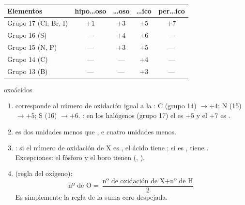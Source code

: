 \documentclass[12pt]{article}
\theoremstyle{mygreennumbox}
\begin{document}
\begin{center}
    \begin{tabular}{@{}lcccc@{}}
        \toprule
        \textbf{Elementos} & \textbf{hipo\dots oso} & \textbf{\dots oso} & \textbf{\dots ico} & \textbf{per\dots ico} \\
        \midrule
        Grupo 17 (Cl, Br, I) & \(+1\) & \(+3\) & \(+5\) & \(+7\) \\[3pt]
        Grupo 16 (S) & --- & \(+4\) & \(+6\) & --- \\[3pt]
        Grupo 15 (N, P) & --- & \(+3\) & \(+5\) & --- \\[3pt]
        Grupo 14 (C) & --- & --- & \(+4\) & --- \\[3pt]
        Grupo 13 (B) & --- & --- & \(+3\) & --- \\
        \bottomrule
    \end{tabular}
\end{center}

\begin{consejos}{oxoácidos}
    \begin{enumerate}[label=\numberballgreen]
        \item {} corresponde al número de oxidación igual a la : C (grupo 14) \(\to +4\); N (15) \(\to +5\); S (16) \(\to +6\). : en los halógenos (grupo 17) el  es \(+5\) y el \(+7\) es .
        \item {} es dos unidades menos que , e  cuatro unidades menos.
        \item {}: si el número de oxidación de X es , el ácido tiene ; si es , tiene . Excepciones: el fósforo y el boro tienen  (, ).
        \item {} (regla del oxígeno):
              \[ \text{nº de O} = \frac{\text{nº de oxidación de X} + \text{nº de H}}{2} \]
              Es simplemente la regla de la suma cero despejada.
    \end{enumerate}
\end{consejos}
\end{document}
